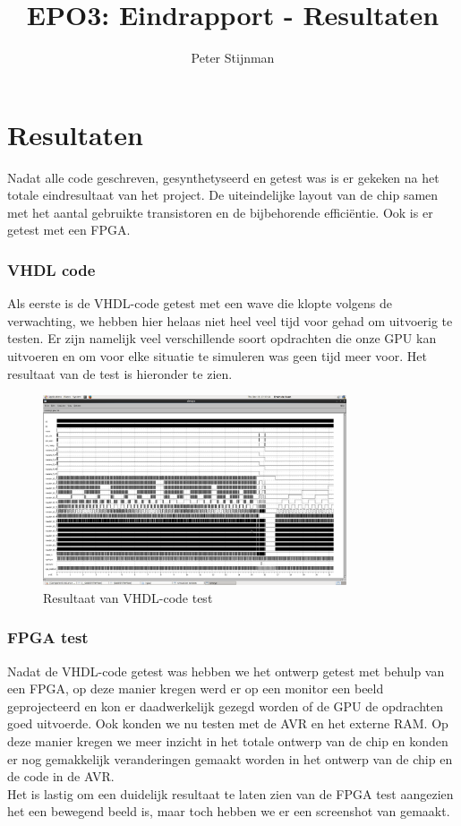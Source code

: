 \documentclass{scrartcl} %
\author{Peter Stijnman}
\title{EPO3: Eindrapport - Resultaten}
\begin{document}
\chapter{Resultaten}
\label{ch:resultaten}


Nadat alle code geschreven, gesynthetyseerd en getest was is er gekeken na het totale eindresultaat van het project. De uiteindelijke layout van de chip samen met het aantal gebruikte transistoren en de bijbehorende efficiëntie. Ook is er getest met een FPGA.

\subsection{VHDL code}

Als eerste is de VHDL-code getest met een wave die klopte volgens de verwachting, we hebben hier helaas niet heel veel tijd voor gehad om uitvoerig te testen. Er zijn namelijk veel verschillende soort opdrachten die onze GPU kan uitvoeren en om voor elke situatie te simuleren was geen tijd meer voor. Het resultaat van de test is hieronder te zien.

\begin{figure}[H]
	\centering
	\includegraphics[width=0.8\textwidth]{layout_sls_wave}
	\caption{Resultaat van VHDL-code test}
\end{figure}



\subsection{FPGA test}

Nadat de VHDL-code getest was hebben we het ontwerp getest met behulp van een FPGA, op deze manier kregen werd er op een monitor een beeld geprojecteerd en kon er daadwerkelijk gezegd worden of de GPU de opdrachten goed uitvoerde. Ook konden we nu testen met de AVR en het externe RAM. Op deze manier kregen we meer inzicht in het totale ontwerp van de chip en konden er nog gemakkelijk veranderingen gemaakt worden in het ontwerp van de chip en de code in de AVR.\\  Het is lastig om een duidelijk resultaat te laten zien van de FPGA test aangezien het een bewegend beeld is, maar toch hebben we er een screenshot van gemaakt.
\end{document}
